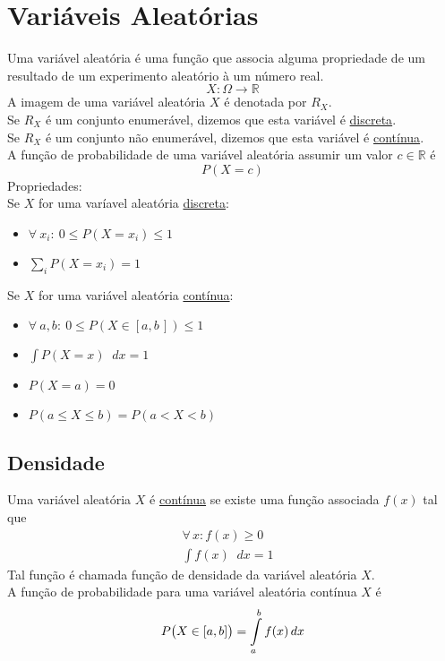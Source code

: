 \documentclass{article}
\newcommand*\diff{\mathop{}\!d}
\begin{document}
\section{Variáveis Aleatórias}
Uma variável aleatória é uma função que associa alguma propriedade de um resultado de um experimento aleatório à um número real.
\[ X: \Omega \to \mathbb{R} \]
A imagem de uma variável aleatória $X$ é denotada por $R_X$. \\[5pt]
Se $R_X$ é um conjunto enumerável, dizemos que esta variável é \uline{discreta}. \\
Se $R_X$ é um conjunto não enumerável, dizemos que esta variável é \uline{contínua}. \\[10pt]
A função de probabilidade de uma variável aleatória assumir um valor $c \in \mathbb{R}$ é
\[ P(X = c) \]
Propriedades: \\[5pt]
Se $X$ for uma varíavel aleatória \uline{discreta}:
\begin{itemize}
  \item $\forall\: x_i:\> 0 \leq P(X = x_i) \leq 1$
  \item $\sum\limits_i P(X = x_i) = 1$
\end{itemize}
\vspace{-5pt}
Se $X$ for uma variável aleatória \uline{contínua}:
\begin{multicols}{2}
  \begin{itemize}
    \item $\forall\: a, b:\> 0 \leq P(X \in [a,b\,]) \leq 1$
    \item $\int P(X = x) \diff x = 1$
    \item $P(X = a) = 0$
    \item $P(a \leq X \leq b) = P(a < X < b)$
  \end{itemize}
\end{multicols}


\subsection{Densidade}
Uma variável aleatória $X$ é \uline{contínua} se existe uma função associada $f(x)$ tal que
\begin{align*}
  \forall\, x: f(x) \geq 0& \\
  \int f(x) \diff x = 1&
\end{align*}
Tal função é chamada função de densidade da variável aleatória $X$. \\[10pt]
A função de probabilidade para uma variável aleatória contínua $X$ é
\[ P\big(X \in [a, b\hspace{0.1pt}]\big) = \int\limits_a^b f(x) \diff x \]
\end{document}
